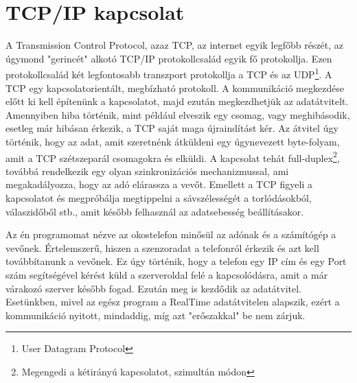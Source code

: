 \documentclass{thesis-ekf}
\theoremstyle{definition}
\theoremstyle{remark}
\begin{document}
\section{TCP/IP kapcsolat}
A Transmission Control Protocol, azaz TCP, az internet egyik legfőbb részét, az úgymond "gerincét" alkotó TCP/IP protokollcsalád egyik fő protokollja. Ezen protokollcsalád két legfontosabb transzport protokollja a TCP és az UDP\footnote{User Datagram Protocol}. A TCP egy kapcsolatorientált, megbízható protokoll. A kommunikáció megkezdése előtt ki kell építenünk a kapcsolatot, majd ezután megkezdhetjük az adatátvitelt. Amennyiben hiba történik, mint például elveszik egy csomag, vagy meghibásodik, esetleg már hibásan érkezik, a TCP saját maga újraindítást kér. Az átvitel úgy történik, hogy az adat, amit szeretnénk átküldeni egy úgynevezett byte-folyam, amit a TCP szétszeparál csomagokra és elküldi. A kapcsolat tehát full-duplex\footnote{Megengedi a kétirányú kapcsolatot, szimultán módon}, továbbá rendelkezik egy olyan szinkronizációs mechanizmussal, ami megakadályozza, hogy az adó elárassza a vevőt. Emellett a TCP figyeli a kapcsolatot és megpróbálja megtippelni a sávszélességét a torlódásokból, válaszidőből stb., amit később felhasznál az adatsebesség beállításakor.
\par Az én programomat nézve az okostelefon minősül az adónak és a számítógép a vevőnek. Értelemszerű, hiszen a szenzoradat a telefonról érkezik és azt kell továbbítanunk a vevőnek. Ez úgy történik, hogy a telefon egy IP cím és egy Port szám segítségével kérést küld a szerveroldal felé a kapcsolódásra, amit a már várakozó szerver később fogad. Ezután meg is kezdődik az adatátvitel. Esetünkben, mivel az egész program a RealTime adatátvitelen alapszik, ezért a kommunikáció nyitott, mindaddig, míg azt "erőszakkal" be nem zárjuk.
\end{document}
